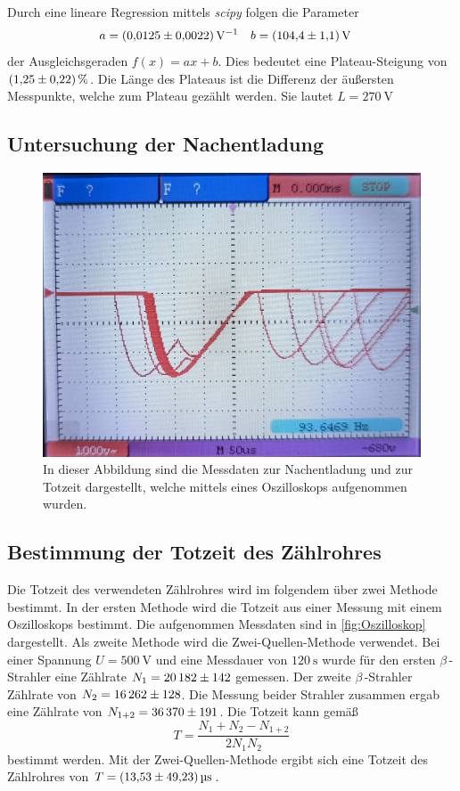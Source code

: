 Durch eine lineare Regression mittels \textit{scipy} \cite{scipy} folgen die Parameter
\begin{align*}
  a &= \qty{0.0125+-0.0022}{\volt^{-1}} & b &= \qty{104.4+-1.1}{\volt}
\end{align*}
der Ausgleichsgeraden $f(x) = ax + b$. Dies bedeutet eine Plateau-Steigung von $\qty{1.25+-0.22}{\percent}$. Die Länge des Plateaus ist die Differenz der äußersten Messpunkte,
welche zum Plateau gezählt werden. Sie lautet $L = \qty{270}{\volt}$

\subsection{Untersuchung der Nachentladung}
\label{subsec:Nachentladung}

\begin{figure}
  \centering
  \includegraphics[width = .8\textwidth]{content/Oszilloskop_bild.jpg}
  \caption{In dieser Abbildung sind die Messdaten zur Nachentladung und zur Totzeit dargestellt, welche mittels eines Oszilloskops aufgenommen wurden.}
  \label{fig:Oszilloskop}
\end{figure}

\subsection{Bestimmung der Totzeit des Zählrohres}
\label{subsec:A_Totzeit}
Die Totzeit des verwendeten Zählrohres wird im folgendem über zwei Methode bestimmt. 
In der ersten Methode wird die Totzeit aus einer Messung mit einem Oszilloskops bestimmt. Die aufgenommen Messdaten sind in \autoref{fig:Oszilloskop} dargestellt.
Als zweite Methode wird die Zwei-Quellen-Methode verwendet. Bei einer Spannung $U = \qty{500}{\volt}$ und eine Messdauer von $\qty{120}{\second}$ wurde für den ersten 
$\beta$\,-Strahler eine Zählrate $N_1 = \num{20182 +- 142}$ gemessen. Der zweite $\beta$\,-Strahler Zählrate von $N_2 = \num{16262 +- 128}$. Die Messung beider 
Strahler zusammen ergab eine Zählrate von $N_{1+2} = \num{36370 +- 191}$. 
Die Totzeit kann gemäß 
\begin{equation}
  \label{eqn:Totzeit}
  T = \frac{N_1 + N_2 - N_{1+2}}{2N_1N_2}
\end{equation}
bestimmt werden. Mit der Zwei-Quellen-Methode ergibt sich eine Totzeit des Zählrohres von $T = \qty{13.53+-49.23}{\micro\second}$.

